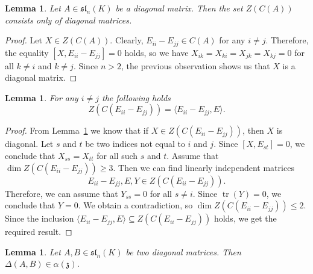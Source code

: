 \documentclass[a4paper,reqno,12pt]{amsart}
\newtheorem{lemma}[proposition]{Lemma}
\theoremstyle{definition}
\theoremstyle{remark}
\def\zzz{\mathfrak{z}}
\def\sl{\mathfrak{sl}}
\renewcommand{\ge}{\geqslant}
\renewcommand{\le}{\leqslant}
\begin{document}
	\begin{lemma}\label{lemma:ZCForDiagInSl}
		Let $A \in \sl_n(K)$ be a diagonal matrix. Then the set $Z(C(A))$ consists only of diagonal matrices.
	\end{lemma}

	\begin{proof}
		Let $X \in Z(C(A))$. Clearly, $E_{ii} - E_{jj} \in C(A)$ for any $i \neq j$. Therefore, the equality $[X, E_{ii} - E_{jj}] = 0$ holds, so we have $X_{ik} = X_{ki} = X_{jk} = X_{kj} = 0$ for all $k \neq i$ and $k \neq j$. Since $n > 2$, the previous observation shows us that $X$ is a diagonal matrix.
	\end{proof}

	\begin{lemma}
		For any $i \neq j$ the following holds
		\begin{equation*}
			Z(C(E_{ii} - E_{jj})) = \langle E_{ii} - E_{jj}, E \rangle.
		\end{equation*}
	\end{lemma}

	\begin{proof}
		From Lemma~\ref{lemma:ZCForDiagInSl} we know that if $X \in Z(C(E_{ii} - E_{jj}))$, then $X$ is diagonal. Let $s$ and $t$ be two indices not equal to $i$ and $j$. Since $[X, E_{st}] = 0$, we conclude that $X_{ss} = X_{tt}$ for all such $s$ and $t$. Assume that $\dim Z(C(E_{ii} - E_{jj})) \ge 3$. Then we can find linearly independent matrices
		\begin{equation*}
			E_{ii} - E_{jj}, E, Y \in Z(C(E_{ii} - E_{jj})).
		\end{equation*}
		Therefore, we can assume that $Y_{ss} = 0$ for all $s \neq i$. Since $\operatorname{tr}(Y) = 0$, we conclude that $Y = 0$. We obtain a contradiction, so $\dim Z(C(E_{ii} - E_{jj})) \le 2$. Since the inclusion $\langle E_{ii} - E_{jj}, E \rangle \subseteq Z(C(E_{ii} - E_{jj}))$ holds, we get the required result.
	\end{proof}

	\begin{lemma}\label{lemma:additivityForBothDiagInSl}
		Let $A, B \in \sl_n(K)$ be two diagonal matrices. Then $\Delta(A, B) \in \alpha(\zzz)$.
	\end{lemma}
\end{document}
